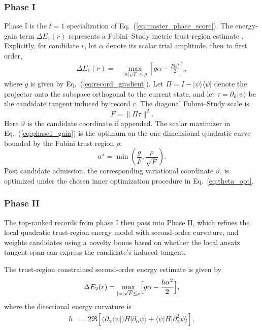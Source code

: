 \documentclass[
  reprint,
  amsmath,
  amssymb,
  aps,
  pra,
  nofootinbib,
  superscriptaddress,
  floatfix
]{revtex4-2}
\newcommand{\ket}[1]{|#1\rangle}
\newcommand{\bra}[1]{\langle #1|}
\begin{document}
\subsubsection{Phase I}

Phase I is the $t=1$ specialization of Eq.~(\ref{eq:master_phase_score}). The energy-gain term $\Delta E_{1}(r)$ represents a Fubini--Study metric trust-region estimate \cite{Nocedal2006TrustRegion}. Explicitly, for candidate $r$, let $\alpha$ denote its scalar trial amplitude, then to first order,
\begin{equation}
\begin{split}
\Delta E_{1}(r)={}&\max_{|\alpha|\sqrt{F}\le \rho} \left[g\alpha-\frac{F\alpha^2}{2}\right],
\end{split}
\label{eq:phase1_gain}
\end{equation}
where $g$ is given by Eq.~(\ref{eq:record_gradient}). Let $\Pi=I-\ket{\psi}\bra{\psi}$ denote the projector onto the subspace orthogonal to the current state, and let $\tau=\partial_{\vartheta}\ket{\psi}$ be the candidate tangent induced by record $r$. The diagonal Fubini--Study scale is
\begin{equation}
F=\|\Pi\tau\|^2.
\label{eq:phase1_tangent_scale}
\end{equation}
Here $\vartheta$ is the candidate coordinate if appended.
The scalar maximizer in Eq.~(\ref{eq:phase1_gain}) is the optimum on the one-dimensional quadratic curve bounded by the Fubini trust region $\rho$:
\begin{equation}
\alpha^\star
=
\min\!\left(
\dfrac{g}{F},
\dfrac{\rho}{\sqrt{F}}
\right).
\label{eq:phase1_alpha_star}
\end{equation}
 Post candidate admission, the corresponding variational coordinate $\vartheta$, is optimized under the chosen inner optimization procedure in Eq.~\ref{eq:theta_opt}.

\subsubsection{Phase II}

The top-ranked records from phase I then pass into Phase II, which refines the local quadratic trust-region energy model with second-order curvature, and weights candidates using a novelty bonus based on whether the local ansatz tangent span can express the candidate's induced tangent. 

The trust-region constrained second-order energy estimate is given by
\begin{equation}
\Delta E_{2}(r)
=\max_{|\alpha|\sqrt{F}\le\rho}
\Bigl[g\alpha -\frac{h\alpha^2}{2}\Bigr],
\label{eq:phase2_gain}
\end{equation}
where the directional energy curvature is
\begin{align}
h&=
2\Re\!\left[
(\partial_{\alpha}\langle \psi|)H|\partial_{\alpha}\psi\rangle
+\langle\psi|H|\partial^2_{\alpha}\psi\rangle
\right],
\label{eq:phase2_hessian}
\end{align}
  
\end{document}

